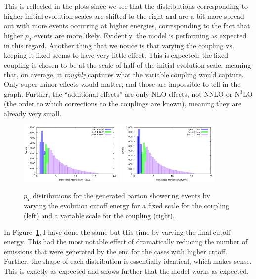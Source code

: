 This is reflected in the plots since we see that the distributions corresponding to higher initial evolution scales are shifted to the right and are a bit more spread out with more events occurring at higher energies, corresponding to the fact that higher $p_T$ events are more likely. Evidently, the model is performing as expected in this regard. Another thing that we notice is that varying the coupling vs. keeping it fixed seems to have very little effect. This is expected: the fixed coupling is chosen to be at the scale of half of the initial evolution scale, meaning that, on average, it \textit{roughly} captures what the variable coupling would capture. Only super minor effects would matter, and those are impossible to tell in the graph. Further, the ``additional effects'' are only NLO effects, not NNLO or N$^3$LO (the order to which corrections to the couplings are known), meaning they are already very small.

\begin{figure}[ht]
  \centering
  \includegraphics[width=0.45\textwidth]{./res/gfx/pt2-fixed2.pdf}
  \includegraphics[width=0.45\textwidth]{./res/gfx/pt2-variable2.pdf}
  \caption{$p_T$ distributions for the generated parton showering events by varying the evolution cutoff energy for a fixed scale for the coupling (left) and a variable scale for the coupling (right).}
  \label{fig:pt-dist2}
\end{figure}

In Figure~\ref{fig:pt-dist2}, I have done the same but this time by varying the final cutoff energy. This had the most notable effect of dramatically reducing the number of emissions that were generated by the end for the cases with higher cutoff. Further, the shape of each distribution is essentially identical, which makes sense. This is exactly as expected and shows further that the model works as expected.


